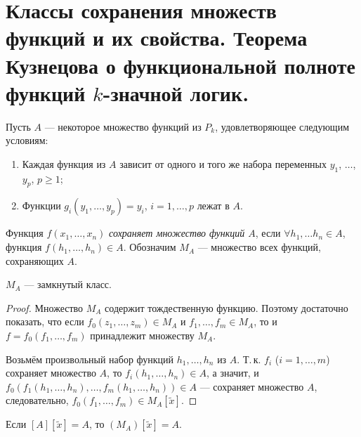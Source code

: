 \section{Классы сохранения множеств функций и их свойства. Теорема Кузнецова о функциональной полноте функций $k$-значной логик.}

Пусть $A$ --- некоторое множество функций из $P_k$, удовлетворяющее следующим условиям:
\begin{enumerate}
    \item Каждая функция из $A$ зависит от одного и того же набора переменных $y_1$, $\ldots$, $y_p$, $p \geqslant 1$;
    \item Функции $g_i(y_1, \ldots, y_p) = y_i$, $i = 1, \ldots, p$ лежат в $A$.
\end{enumerate}

\begin{definition}
    Функция $f(x_1, \ldots, x_n)$ \textit{сохраняет множество функций $A$}, если $\forall h_1, \ldots h_n \in A$, функция $f(h_1, \ldots, h_n) \in A$. Обозначим $M_A$ --- множество всех функций, сохраняющих $A$.
\end{definition}

\begin{lemma}
    $M_A$ --- замкнутый класс.
\end{lemma}

\begin{proof}
    Множество $M_A$ содержит тождественную функцию. Поэтому достаточно показать, что если $f_0(z_1, \ldots, z_m) \in M_A$  и $f_1, \ldots, f_m \in M_A$, то и $f = f_0(f_1, \ldots, f_m)$ принадлежит множеству $M_A$.

    Возьмём произвольный набор функций $h_1, \ldots, h_n$ из $A$. Т.\,к. $f_i$ ($i = 1, \ldots, m$) сохраняет множество $A$, то $f_i(h_1, \ldots, h_n) \in A$, а значит, и $f_0(f_1(h_1, \ldots, h_n),\ldots, f_m(h_1, \ldots, h_n)) \in A$ --- сохраняет множество $A$, следовательно, $f_0(f_1,\ldots, f_m) \in M_A[\widetilde{x}]$.
\end{proof}

\begin{lemma}
    Если $[A][\widetilde{x}] = A$, то $(M_A)[\widetilde{x}] = A$.
\end{lemma}

